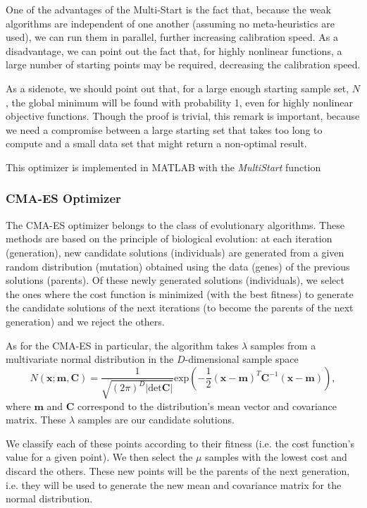 One of the advantages of the Multi-Start is the fact that, because the weak algorithms are independent of one another (assuming no meta-heuristics are used), we can run them in parallel, further increasing calibration speed.
As a disadvantage, we can point out the fact that, for highly nonlinear functions, a large number of starting points may be required, decreasing the calibration speed.

As a sidenote, we should point out that, for a large enough starting sample set, $N$, the global minimum will be found with probability 1, even for highly nonlinear objective functions. Though the proof is trivial, this remark is important, because we need a compromise between a large starting set that takes too long to compute and a small data set that might return a non-optimal result.


This optimizer is implemented in MATLAB with the \emph{MultiStart} function~\cite{MATLABMS}

\subsubsection{CMA-ES Optimizer}
The CMA-ES optimizer belongs to the class of evolutionary algorithms. These methods are based on the principle of biological evolution: at each iteration (generation), new candidate solutions (individuals) are generated from a given random distribution (mutation) obtained using the data (genes) of the previous solutions (parents). Of these newly generated solutions (individuals), we select the ones where the cost function is minimized (with the best fitness) to generate the candidate solutions of the next iterations (to become the parents of the next generation) and we reject the others.



As for the CMA-ES in particular, the algorithm takes $\lambda$ samples from a multivariate normal distribution in the $D$-dimensional sample space
\begin{equation}
N(\mathbf{x;m,C})=\frac{1}{\sqrt{(2\pi)^D|\mathrm{det}\mathbf{C}|}}\mathrm{exp}\left(-\frac{1}{2}(\mathbf{x}-\mathbf{m})^T\mathbf{C}^{-1}(\mathbf{x}-\mathbf{m})\right),
\end{equation}
\noindent where $\mathbf{m}$ and $\mathbf{C}$ correspond to the distribution's mean vector and covariance matrix.
These $\lambda$ samples are our candidate solutions.

We classify each of these points according to their fitness (i.e. the cost function's value for a given point). We then select the $\mu$ samples with the lowest cost and discard the others. These new points will be the parents of the next generation, i.e. they will be used to generate the new mean and covariance matrix for the normal distribution.



